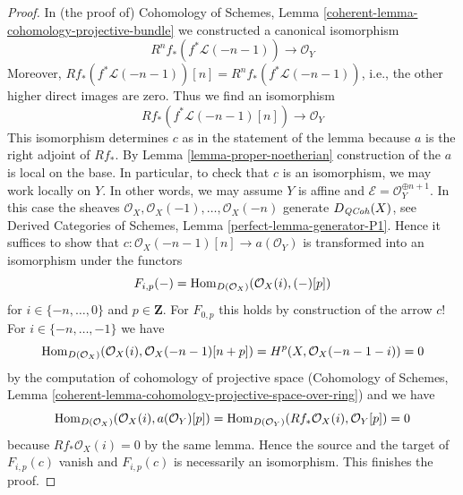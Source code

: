 \begin{proof}
In (the proof of) Cohomology of Schemes, Lemma
\ref{coherent-lemma-cohomology-projective-bundle}
we constructed a canonical isomorphism
$$
R^nf_*(f^*\mathcal{L}(-n - 1)) \longrightarrow \mathcal{O}_Y
$$
Moreover, $Rf_*(f^*\mathcal{L}(-n - 1))[n] = R^nf_*(f^*\mathcal{L}(-n - 1))$,
i.e., the other higher direct images are zero. Thus we find an isomorphism
$$
Rf_*(f^*\mathcal{L}(-n - 1)[n]) \longrightarrow \mathcal{O}_Y
$$
This isomorphism determines $c$ as in the statement of the lemma
because $a$ is the right adjoint of $Rf_*$.
By Lemma \ref{lemma-proper-noetherian} construction of the $a$
is local on the base. In particular, to check that
$c$ is an isomorphism, we may work locally on $Y$.
In other words, we may assume $Y$ is affine and
$\mathcal{E} = \mathcal{O}_Y^{\oplus n + 1}$.
In this case the sheaves $\mathcal{O}_X, \mathcal{O}_X(-1), \ldots,
\mathcal{O}_X(-n)$ generate $D_{\mathit{QCoh}}(X)$, see
Derived Categories of Schemes, Lemma \ref{perfect-lemma-generator-P1}.
Hence it suffices to show that
$c : \mathcal{O}_X(-n - 1)[n] \to a(\mathcal{O}_Y)$
is transformed into an isomorphism under the functors
$$
F_{i, p}(-) = \mathop{\mathrm{Hom}}\nolimits_{D(\mathcal{O}_X)}(\mathcal{O}_X(i), (-)[p])
$$
for $i \in \{-n, \ldots, 0\}$ and $p \in \mathbf{Z}$.
For $F_{0, p}$ this holds by construction of the arrow $c$!
For $i \in \{-n, \ldots, -1\}$ we have
$$
\mathop{\mathrm{Hom}}\nolimits_{D(\mathcal{O}_X)}(\mathcal{O}_X(i), \mathcal{O}_X(-n - 1)[n + p]) =
H^p(X, \mathcal{O}_X(-n - 1 - i)) = 0
$$
by the computation of cohomology of projective space
(Cohomology of Schemes, Lemma
\ref{coherent-lemma-cohomology-projective-space-over-ring})
and we have
$$
\mathop{\mathrm{Hom}}\nolimits_{D(\mathcal{O}_X)}(\mathcal{O}_X(i), a(\mathcal{O}_Y)[p]) =
\mathop{\mathrm{Hom}}\nolimits_{D(\mathcal{O}_Y)}(Rf_*\mathcal{O}_X(i), \mathcal{O}_Y[p]) = 0
$$
because $Rf_*\mathcal{O}_X(i) = 0$ by the same lemma.
Hence the source and the target of $F_{i, p}(c)$ vanish
and $F_{i, p}(c)$ is necessarily an isomorphism.
This finishes the proof.
\end{proof}


